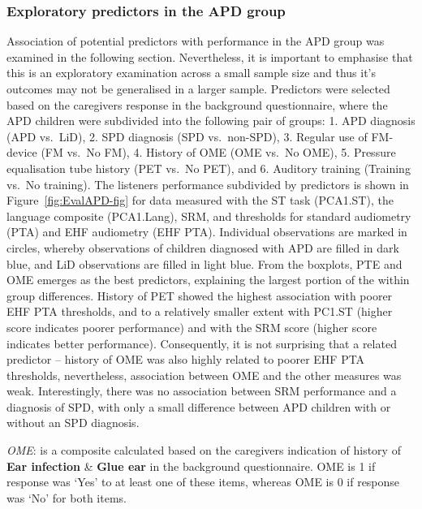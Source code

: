 \documentclass[a4paper, twoside]{templates/ociamthesis}
\begin{document}
\hypertarget{exploratory-predictors-in-the-apd-group}{%
\subsubsection{Exploratory predictors in the APD group}\label{exploratory-predictors-in-the-apd-group}}

Association of potential predictors with performance in the APD group was examined in the following section. Nevertheless, it is important to emphasise that this is an exploratory examination across a small sample size and thus it's outcomes may not be generalised in a larger sample. Predictors were selected based on the caregivers response in the background questionnaire, where the APD children were subdivided into the following pair of groups: 1. APD diagnosis (APD vs.~LiD), 2. SPD diagnosis (SPD vs.~non-SPD), 3. Regular use of FM-device (FM vs.~No FM), 4. History of OME (OME vs.~No OME), 5. Pressure equalisation tube history (PET vs.~No PET), and 6. Auditory training (Training vs.~No training). The listeners performance subdivided by predictors is shown in Figure~\ref{fig:EvalAPD-fig} for data measured with the ST task (PCA1.ST), the language composite (PCA1.Lang), SRM, and thresholds for standard audiometry (PTA) and EHF audiometry (EHF PTA). Individual observations are marked in circles, whereby observations of children diagnosed with APD are filled in dark blue, and LiD observations are filled in light blue. From the boxplots, PTE and OME emerges as the best predictors, explaining the largest portion of the within group differences. History of PET showed the highest association with poorer EHF PTA thresholds, and to a relatively smaller extent with PC1.ST (higher score indicates poorer performance) and with the SRM score (higher score indicates better performance). Consequently, it is not surprising that a related predictor -- history of OME was also highly related to poorer EHF PTA thresholds, nevertheless, association between OME and the other measures was weak. Interestingly, there was no association between SRM performance and a diagnosis of SPD, with only a small difference between APD children with or without an SPD diagnosis.\\

\begin{correction}
\emph{OME}: is a composite calculated based on the caregivers indication
of history of \textbf{Ear infection} \& \textbf{Glue ear} in the
background questionnaire. OME is 1 if response was `Yes' to at least one
of these items, whereas OME is 0 if response was `No' for both items.
\end{correction}
\end{document}
